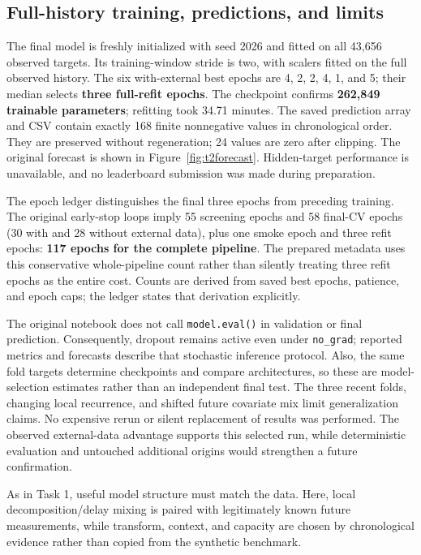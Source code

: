 \documentclass[11pt,a4paper]{article}
\begin{document}
\subsection*{Full-history training, predictions, and limits}
The final model is freshly initialized with seed 2026 and fitted on all 43,656 observed targets. Its training-window stride is two, with scalers fitted on the full observed history. The six with-external best epochs are 4, 2, 2, 4, 1, and 5; their median selects \textbf{three full-refit epochs}. The checkpoint confirms \textbf{262,849 trainable parameters}; refitting took 34.71 minutes. The saved prediction array and CSV contain exactly 168 finite nonnegative values in chronological order. They are preserved without regeneration; 24 values are zero after clipping. The original forecast is shown in Figure~\ref{fig:t2forecast}. Hidden-target performance is unavailable, and no leaderboard submission was made during preparation.

The epoch ledger distinguishes the final three epochs from preceding training. The original early-stop loops imply 55 screening epochs and 58 final-CV epochs (30 with and 28 without external data), plus one smoke epoch and three refit epochs: \textbf{117 epochs for the complete pipeline}. The prepared metadata uses this conservative whole-pipeline count rather than silently treating three refit epochs as the entire cost. Counts are derived from saved best epochs, patience, and epoch caps; the ledger states that derivation explicitly.

The original notebook does not call \texttt{model.eval()} in validation or final prediction. Consequently, dropout remains active even under \texttt{no\_grad}; reported metrics and forecasts describe that stochastic inference protocol. Also, the same fold targets determine checkpoints and compare architectures, so these are model-selection estimates rather than an independent final test. The three recent folds, changing local recurrence, and shifted future covariate mix limit generalization claims. No expensive rerun or silent replacement of results was performed. The observed external-data advantage supports this selected run, while deterministic evaluation and untouched additional origins would strengthen a future confirmation.

As in Task 1, useful model structure must match the data. Here, local decomposition/delay mixing is paired with legitimately known future measurements, while transform, context, and capacity are chosen by chronological evidence rather than copied from the synthetic benchmark.
\end{document}
